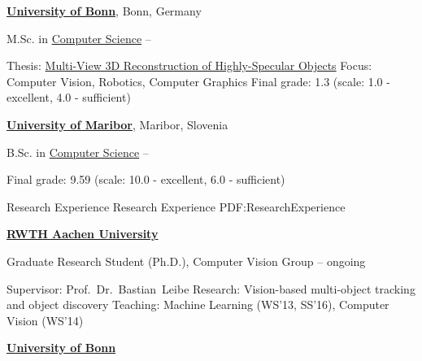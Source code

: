 \documentclass[letterpaper,MMMyyyy,nonstopmode]{simpleresumecv}
\begin{document}
\begin{Body}
\BigGap
\Entry
\href{https://www.uni-bonn.de/}
{\textbf{University of Bonn}},
Bonn, Germany

\Gap
\BulletItem
M.Sc. in
\href{https://www.informatik.uni-bonn.de/de/fuer-studierende/master-of-science-in-computer-science}
{Computer Science}
\hfill
{} --
\begin{Detail}
\SubBulletItem
Thesis:
\href{https://www.vision.rwth-aachen.de/media/papers/thesis_doc.pdf}
{Multi-View 3D Reconstruction of Highly-Specular Objects}
\SubBulletItem
Focus:
Computer Vision, Robotics, Computer Graphics
%
\SubBulletItem
Final grade: 1.3 (scale: 1.0 - excellent, 4.0 - sufficient)
\end{Detail}

\BigGap
\Entry
\href{https://www.um.si}
{\textbf{University of Maribor}},
Maribor, Slovenia

\Gap
\BulletItem
B.Sc. in
\href{https://feri.um.si/en/}
{Computer Science}
\hfill
{} --
\begin{Detail}
\SubBulletItem
Final grade: 9.59 (scale: 10.0 - excellent, 6.0 - sufficient)
\end{Detail}

\Section
{Research Experience}
{Research Experience}
{PDF:ResearchExperience}

\Entry
\href{http://www.rwth-aachen.de}
{\textbf{RWTH Aachen University}}

\Gap
\BulletItem
Graduate Research Student (Ph.D.), Computer Vision Group
\hfill
{} -- ongoing
\begin{Detail}
\SubBulletItem
Supervisor:
Prof.~Dr.~Bastian~Leibe
\SubBulletItem
Research:
Vision-based multi-object tracking and object discovery
\SubBulletItem
Teaching: Machine Learning (WS'13, SS'16), Computer Vision (WS'14)
\end{Detail}

\Gap
\Entry
\href{https://www.uni-bonn.de/}
{\textbf{University of Bonn}}
%


\end{Body}
\end{document}
